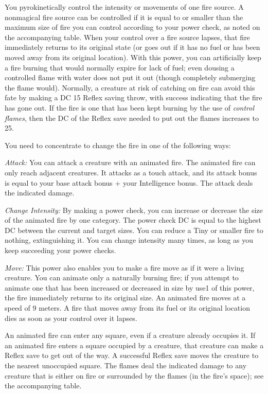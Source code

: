 {
	You pyrokinetically control the intensity or movements of one fire source. A nonmagical fire source can be controlled if it is equal to or smaller than the maximum size of fire you can control according to your power check, as noted on the accompanying table.	When your control over a fire source lapses, that fire immediately returns to its original state (or goes out if it has no fuel or has been moved away from its original location). With this power, you can artificially keep a fire burning that would normally expire for lack of fuel; even dousing a controlled flame with water does not put it out (though completely submerging the flame would). Normally, a creature at risk of catching on fire can avoid this fate by making a DC 15 Reflex saving throw, with success indicating that the fire has gone out. If the fire is one that has been kept burning by the use of \emph{control flames}, then the DC of the Reflex save needed to put out the flames increases to 25.

	You need to concentrate to change the fire in one of the following ways:

	\textit{Attack:} You can attack a creature with an animated fire. The animated fire can only reach adjacent creatures. It attacks as a touch attack, and its attack bonus is equal to your base attack bonus + your Intelligence bonus. The attack deals the indicated damage.

	\textit{Change Intensity:} By making a power check, you can increase or decrease the size of the animated fire by one category. The power check DC is equal to the highest DC between the current and target sizes. You can reduce a Tiny or smaller fire to nothing, extinguishing it. You can change intensity many times, as long as you keep succeeding your power checks.

	\textit{Move:} This power also enables you to make a fire move as if it were a living creature. You can animate only a naturally burning fire; if you attempt to animate one that has been increased or decreased in size by use1 of this power, the fire immediately returns to its original size. An animated fire moves at a speed of 9 meters. A fire that moves away from its fuel or its original location dies as soon as your control over it lapses.

	An animated fire can enter any square, even if a creature already occupies it. If an animated fire enters a square occupied by a creature, that creature can make a Reflex save to get out of the way. A successful Reflex save moves the creature to the nearest unoccupied square. The flames deal the indicated damage to any creature that is either on fire or surrounded by the flames (in the fire's space); see the accompanying table.

}
